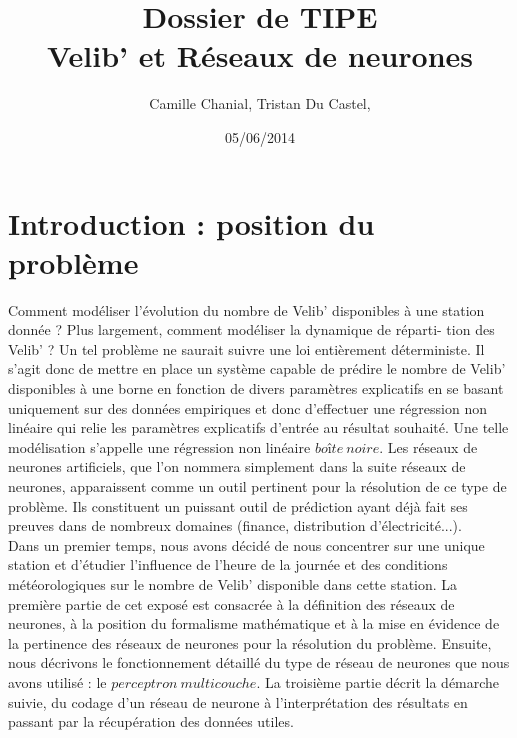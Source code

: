 \documentclass[a4paper, 11pt]{article}
\begin{document}
 
\title{Dossier de TIPE \\ Velib' et Réseaux de neurones}
\author{Camille Chanial, Tristan Du Castel, }
\date{05/06/2014} 
 
\maketitle

\tableofcontents
 

\newpage

\section*{Introduction : position du problème}

Comment modéliser l'évolution du nombre de Velib' disponibles à une station donnée ? Plus largement, comment modéliser la dynamique de réparti- tion des Velib' ? 
 Un tel problème ne saurait suivre une loi entièrement déterministe. Il s'agit donc de mettre en place un système capable de prédire le nombre de Velib' disponibles à une borne en fonction de divers paramètres explicatifs en se basant uniquement sur des données empiriques et donc d'effectuer une régression non linéaire qui relie les paramètres explicatifs d'entrée au résultat souhaité. Une telle modélisation s'appelle une régression non linéaire $boîte\ noire$. Les réseaux de neurones artificiels, que l'on nommera simplement dans la suite réseaux de neurones, apparaissent comme un outil pertinent pour la résolution de ce type de problème. Ils constituent un puissant outil de prédiction ayant déjà fait ses preuves dans de nombreux domaines (finance, distribution d'électricité...). \\
Dans un premier temps, nous avons décidé de nous concentrer sur une unique station et d'étudier l'influence de l'heure de la journée et des conditions météorologiques sur le nombre de Velib' disponible dans cette station. La première partie de cet exposé est consacrée à la définition des réseaux de neurones, à la position du formalisme mathématique et à la mise en évidence de la pertinence des réseaux de neurones pour la résolution du problème. Ensuite, nous décrivons le fonctionnement détaillé du type de réseau de neurones que nous avons utilisé : le $perceptron\ multicouche$. La troisième partie décrit la démarche suivie, du codage d'un réseau de neurone à l'interprétation des résultats en passant par la récupération des données utiles. 
\end{document}

